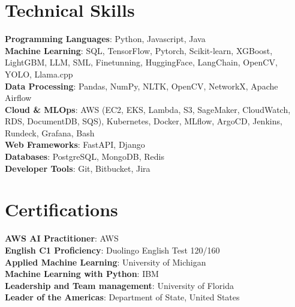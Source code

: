 \documentclass[letterpaper,11pt]{article}
\begin{document}
%
\section{Technical Skills}
\begin{itemize}[leftmargin=0.15in, label={}]
  \small{\item{
        \textbf{Programming Languages}{: Python, Javascript, Java} \\
        \textbf{Machine Learning}{: SQL, TensorFlow, Pytorch, Scikit-learn, XGBoost, LightGBM, LLM, SML, Finetunning, HuggingFace, LangChain, OpenCV, YOLO, Llama.cpp} \\
        \textbf{Data Processing}{: Pandas, NumPy, NLTK, OpenCV, NetworkX, Apache Airflow} \\
        \textbf{Cloud \& MLOps}{: AWS (EC2, EKS, Lambda, S3, SageMaker, CloudWatch, RDS, DocumentDB, SQS), Kubernetes, Docker, MLflow, ArgoCD, Jenkins, Rundeck, Grafana, Bash} \\
        \textbf{Web Frameworks}{: FastAPI, Django} \\
        \textbf{Databases}{: PostgreSQL, MongoDB, Redis} \\
        \textbf{Developer Tools}{: Git, Bitbucket, Jira}
        }}
\end{itemize}

\section{Certifications}
\begin{itemize}[leftmargin=0.15in, label={}]
  \small{\item{
        \textbf{AWS AI Practitioner}{: AWS} \\
        \textbf{English C1 Proficiency}{: Duolingo English Test 120/160} \\
        \textbf{Applied Machine Learning}{: University of Michigan} \\
        \textbf{Machine Learning with Python}{: IBM} \\
        \textbf{Leadership and Team management}{: University of Florida} \\
        \textbf{Leader of the Americas}{: Department of State, United States} \\

        }}
\end{itemize}

\end{document}
